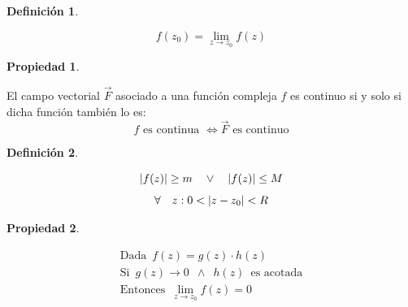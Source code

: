 \documentclass[a5paper,12pt,twoside]{book}
\newtheorem{defn}{{Definición}}[chapter]
\newtheorem{prop}{{Propiedad}}[chapter]
\begin{document}
\begin{mdframed}[style=DefinitionFrame]
    \begin{defn}
    \end{defn}
    \begin{equation*}
        f(z_0)=\lim_{z \to z_0}f(z)
    \end{equation*}
\end{mdframed}

\begin{mdframed}[style=PropertyFrame]
    \begin{prop}
    \end{prop}
    El campo vectorial $\Vec{F}$ asociado a una función compleja $f$ es continuo si y solo si dicha función también lo es:
    \begin{equation*}
        \textrm{$f$ es continua $\iff \Vec{F}$ es continuo}
    \end{equation*}
\end{mdframed}

\begin{mdframed}[style=DefinitionFrame]
    \begin{defn}
    \end{defn}
    \begin{gather*}
        {\left| {f(z)} \right|} \geq m \quad \lor \quad {\left| {f(z)} \right|} \leq M
        \\[1ex]
        \forall \quad z: 0 < {\left| {z-z_0} \right|} < R
    \end{gather*}
\end{mdframed}

\begin{mdframed}[style=PropertyFrame]
    \begin{prop}
    \end{prop}
    \begin{gather*}
        \textrm{Dada} \enspace f(z)=g(z) \cdot h(z)
        \\
        \textrm{Si} \enspace g(z) \to 0 \enspace \land \enspace h(z) \enspace \textrm{es acotada}
        \\
        \textrm{Entonces} \enspace \lim_{z \to z_0} f(z) = 0
    \end{gather*}
\end{mdframed}
\end{document}
